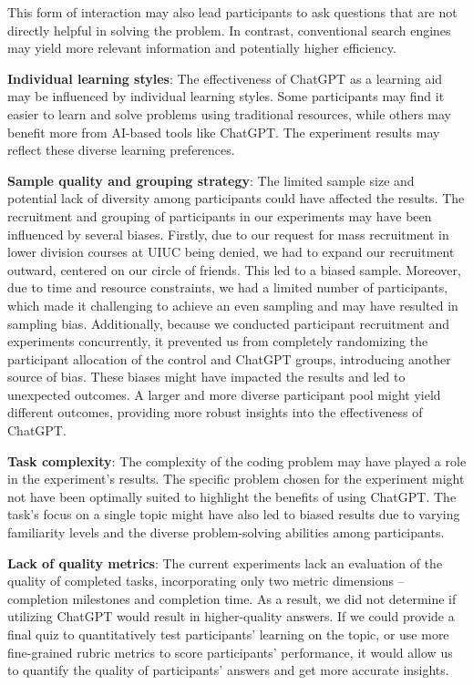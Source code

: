 \documentclass[manuscript,screen,nonacm]{acmart}
\begin{document}
This form of interaction may also lead participants to ask questions that are not directly helpful in solving the problem. In contrast, conventional search engines may yield more relevant information and potentially higher efficiency. 

\textbf{Individual learning styles}: The effectiveness of ChatGPT as a learning aid may be influenced by individual learning styles. Some participants may find it easier to learn and solve problems using traditional resources, while others may benefit more from AI-based tools like ChatGPT. The experiment results may reflect these diverse learning preferences.

\textbf{Sample quality and grouping strategy}: The limited sample size and potential lack of diversity among participants could have affected the results. The recruitment and grouping of participants in our experiments may have been influenced by several biases. Firstly, due to our request for mass recruitment in lower division courses at UIUC being denied, we had to expand our recruitment outward, centered on our circle of friends. This led to a biased sample. Moreover, due to time and resource constraints, we had a limited number of participants, which made it challenging to achieve an even sampling and may have resulted in sampling bias. Additionally, because we conducted participant recruitment and experiments concurrently, it prevented us from completely randomizing the participant allocation of the control and ChatGPT groups, introducing another source of bias. These biases might have impacted the results and led to unexpected outcomes. A larger and more diverse participant pool might yield different outcomes, providing more robust insights into the effectiveness of ChatGPT.

\textbf{Task complexity}: The complexity of the coding problem may have played a role in the experiment's results. The specific problem chosen for the experiment might not have been optimally suited to highlight the benefits of using ChatGPT. The task's focus on a single topic might have also led to biased results due to varying familiarity levels and the diverse problem-solving abilities among participants.


\textbf{Lack of quality metrics}: The current experiments lack an evaluation of the quality of completed tasks, incorporating only two metric dimensions – completion milestones and completion time. As a result, we did not determine if utilizing ChatGPT would result in higher-quality answers. If we could provide a final quiz to quantitatively test participants' learning on the topic, or use more fine-grained rubric metrics to score participants' performance, it would allow us to quantify the quality of participants' answers and get more accurate insights.
\end{document}

